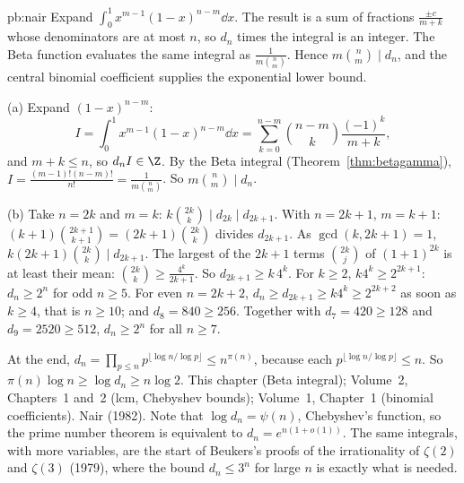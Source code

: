\begin{solution}{pb:nair}
\idea Expand $\int_0^1x^{m-1}(1-x)^{n-m}\dd x$. The result is a sum of fractions $\frac{\pm c}{m+k}$ whose denominators are at most $n$, so $d_n$ times the integral is an integer. The Beta function evaluates the same integral as $\frac1{m\binom nm}$. Hence $m\binom nm\mid d_n$, and the central binomial coefficient supplies the exponential lower bound.

\writeup (a) Expand $(1-x)^{n-m}$:
\[
I=\int_0^1x^{m-1}(1-x)^{n-m}\dd x=\sum_{k=0}^{n-m}\binom{n-m}k\frac{(-1)^k}{m+k},
\]
and $m+k\le n$, so $d_nI\in\Z$. By the Beta integral (Theorem~\ref{thm:betagamma}), $I=\frac{(m-1)!(n-m)!}{n!}=\frac1{m\binom nm}$. So $m\binom nm\mid d_n$.

(b) Take $n=2k$ and $m=k$: $k\binom{2k}k\mid d_{2k}\mid d_{2k+1}$. With $n=2k+1$, $m=k+1$: $(k+1)\binom{2k+1}{k+1}=(2k+1)\binom{2k}k$ divides
$d_{2k+1}$. As $\gcd(k,2k+1)=1$, $k(2k+1)\binom{2k}k\mid d_{2k+1}$. The largest of the $2k+1$ terms $\binom{2k}j$ of $(1+1)^{2k}$ is at
least their mean: $\binom{2k}k\ge\frac{4^k}{2k+1}$. So $d_{2k+1}\ge k\,4^k$. For $k\ge2$, $k4^k\ge2^{2k+1}$: $d_n\ge2^n$ for odd $n\ge5$. For
even $n=2k+2$, $d_n\ge d_{2k+1}\ge k4^k\ge2^{2k+2}$ as soon as $k\ge4$, that is $n\ge10$; and $d_8=840\ge256$. Together with
$d_7=420\ge128$ and $d_9=2520\ge512$, $d_n\ge2^n$ for all $n\ge7$.

At the end, $d_n=\prod_{p\le n}p^{\lfloor\log n/\log p\rfloor}\le n^{\pi(n)}$, because each $p^{\lfloor\log n/\log p\rfloor}\le n$. So
$\pi(n)\log n\ge\log d_n\ge n\log2$.
\tools This chapter (Beta integral); Volume~2, Chapters~1 and~2 (lcm, Chebyshev bounds); Volume~1, Chapter~1 (binomial coefficients).
\leads Nair (1982). Note that $\log d_n=\psi(n)$, Chebyshev's function, so the prime number theorem is equivalent to
$d_n=e^{n(1+o(1))}$. The same integrals, with more variables, are the start of Beukers's proofs of the irrationality of $\zeta(2)$ and
$\zeta(3)$ (1979), where the bound $d_n\le3^n$ for large $n$ is exactly what is needed.
\end{solution}

